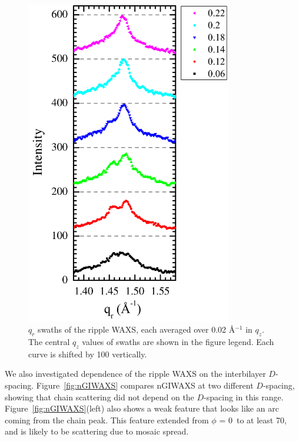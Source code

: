 \begin{figure}[htbp]
  \centering
  \includegraphics[width=0.8\textwidth]{figures/ripple/nGIWAXS/qrplots}
  \caption{$q_r$ swaths of the ripple WAXS, each averaged over 0.02 \AA$^{-1}$
  in $q_z$. The central $q_z$ values of swaths are shown in the figure legend.  Each curve is shifted by 100 vertically. }
  \label{fig:qrplots}
\end{figure}

We also investigated dependence of the ripple WAXS on the interbilayer
$D$-spacing. Figure~\ref{fig:nGIWAXS} compares nGIWAXS at two different $D$-spacing,
showing that chain scattering did not depend on the $D$-spacing in this range. 
Figure~\ref{fig:nGIWAXS}(left) also shows a weak feature that looks like an 
arc coming from the chain peak. This feature extended
from $\phi$ = 0\textdegree\ to at least 70\textdegree, and
is likely to be scattering due to mosaic spread.

